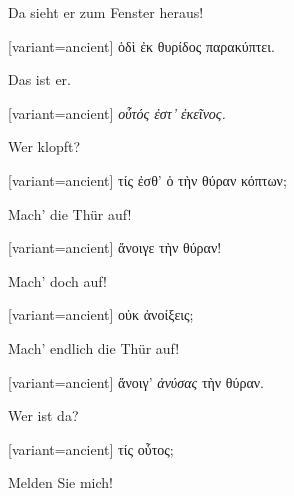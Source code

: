 Da sieht er zum Fenster heraus!

\switchcolumn

\begin{greek}[variant=ancient]%
ὁδὶ ἐκ θυρίδος παρακύπτει.

\end{greek}%
\switchcolumn*

Das ist er.

\switchcolumn

\begin{greek}[variant=ancient]%
\emph{οὗτός ἐστ’ ἐκεῖνος.}

\end{greek}%
\switchcolumn*

Wer klopft?

\switchcolumn

\begin{greek}[variant=ancient]%
τίς ἐσθ’ ὁ τὴν θύραν κόπτων;

\end{greek}%
\switchcolumn*

Mach' die Thür auf!

\switchcolumn

\begin{greek}[variant=ancient]%
ἄνοιγε τὴν θύραν!

\end{greek}%
\switchcolumn*

Mach' doch auf!

\switchcolumn

\begin{greek}[variant=ancient]%
οὐκ ἀνοίξεις;

\end{greek}%
\switchcolumn*

Mach' endlich die Thür auf!

\switchcolumn

\begin{greek}[variant=ancient]%
ἄνοιγ’ \emph{ἀνύσας} τὴν θύραν.

\end{greek}%
\switchcolumn*

Wer ist da?

\switchcolumn

\begin{greek}[variant=ancient]%
τίς οὗτος;

\end{greek}%
\switchcolumn*

Melden Sie mich!

\switchcolumn

